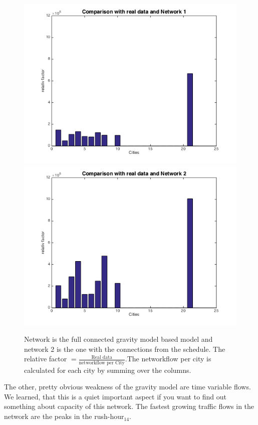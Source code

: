 \documentclass[11pt]{article}
\begin{document}
\begin{figure}[h]
\includegraphics[scale=0.4]{compare1}
\includegraphics[scale=0.4]{compare2}
 \caption{Network is the full connected gravity model based model and network 2 is the one with the connections from the schedule. The relative factor $=\frac{\text{Real data}}{\text{networkflow per City}}$.The networkflow per city is calculated for each city by summing over the columns.}
\end{figure}






The other, pretty obvious weakness of the gravity model are time variable flows. We learned, that this is a quiet important aspect if you want to find out something about capacity of this network. The fastest growing traffic flows in the network are the peaks in the rush-hour$_{14}$.
\end{document}

